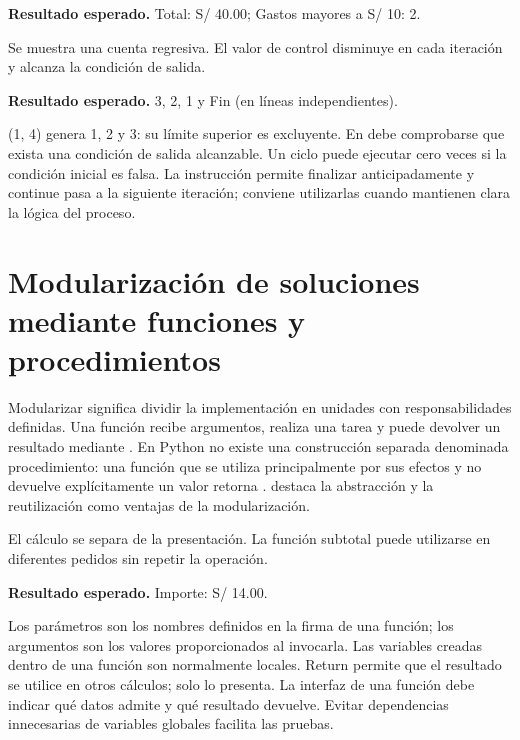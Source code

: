 
\textbf{Resultado esperado.} Total: S/ 40.00; Gastos mayores a S/ 10: 2.




Se muestra una cuenta regresiva. El valor de control disminuye en cada iteración y alcanza la condición de salida.


\textbf{Resultado esperado.} 3, 2, 1 y Fin (en líneas independientes).

(1, 4) genera 1, 2 y 3: su límite superior es excluyente. En  debe comprobarse que exista una condición de salida alcanzable. Un ciclo puede ejecutar cero veces si la condición inicial es falsa. La instrucción  permite finalizar anticipadamente y continue pasa a la siguiente iteración; conviene utilizarlas cuando mantienen clara la lógica del proceso.

\section{Modularización de soluciones mediante funciones y procedimientos}

Modularizar significa dividir la implementación en unidades con responsabilidades definidas. Una función recibe argumentos, realiza una tarea y puede devolver un resultado mediante . En Python no existe una construcción separada denominada procedimiento: una función que se utiliza principalmente por sus efectos y no devuelve explícitamente un valor retorna . \textcite[cap.~2]{farrell2013} destaca la abstracción y la reutilización como ventajas de la modularización.


El cálculo se separa de la presentación. La función subtotal puede utilizarse en diferentes pedidos sin repetir la operación.


\textbf{Resultado esperado.} Importe: S/ 14.00.

Los parámetros son los nombres definidos en la firma de una función; los argumentos son los valores proporcionados al invocarla. Las variables creadas dentro de una función son normalmente locales. Return permite que el resultado se utilice en otros cálculos;  solo lo presenta. La interfaz de una función debe indicar qué datos admite y qué resultado devuelve. Evitar dependencias innecesarias de variables globales facilita las pruebas.

